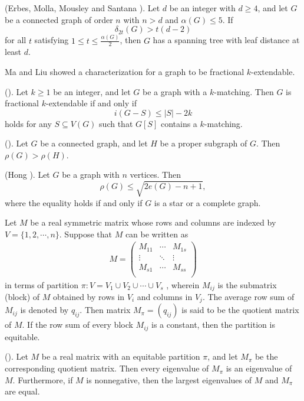 \documentclass[10pt]{article}
\numberwithin{equation}{section}
\begin{document}
\medskip

 (Erbes, Molla, Mousley and Santana \cite{EMMS}). Let $d$ be an integer with $d\geq4$, and let $G$ be a connected graph
of order $n$ with $n>d$ and $\alpha(G)\leq5$. If
$$
\delta_{2t}(G)>t(d-2)
$$
for all $t$ satisfying $1\leq t\leq\frac{\alpha(G)}{2}$, then $G$ has a spanning tree with leaf distance at least $d$.

\medskip

Ma and Liu \cite{ML} showed a characterization for a graph to be fractional $k$-extendable.

\medskip

 (\cite{ML}). Let $k\geq1$ be an integer, and let $G$ be a graph with a $k$-matching. Then $G$ is fractional
$k$-extendable if and only if
$$
i(G-S)\leq|S|-2k
$$
holds for any $S\subseteq V(G)$ such that $G[S]$ contains a $k$-matching.

\medskip

 (\cite{B}). Let $G$ be a connected graph, and let $H$ be a proper subgraph of $G$. Then $\rho(G)>\rho(H)$.

\medskip

 (Hong \cite{Ha}). Let $G$ be a graph with $n$ vertices. Then
$$
\rho(G)\leq\sqrt{2e(G)-n+1},
$$
where the equality holds if and only if $G$ is a star or a complete graph.

\medskip

Let $M$ be a real symmetric matrix whose rows and columns are indexed by $V=\{1,2,\cdots,n\}$.
Suppose that $M$ can be written as
\begin{align*}
M=\left(
  \begin{array}{ccc}
    M_{11} & \cdots & M_{1s}\\
    \vdots & \ddots & \vdots\\
    M_{s1} & \cdots & M_{ss}\\
  \end{array}
\right)
\end{align*}
in terms of partition $\pi: V=V_1\cup V_2\cup\cdots\cup V_s$ , wherein $M_{ij}$ is the submatrix (block) of $M$ obtained by rows in $V_i$ and
columns in $V_j$. The average row sum of $M_{ij}$ is denoted by $q_{ij}$. Then matrix $M_{\pi}=(q_{ij})$ is said to be the quotient matrix of $M$.
If the row sum of every block $M_{ij}$ is a constant, then the partition is equitable.

\medskip

 (\cite{YYSX}). Let $M$ be a real matrix with an equitable partition $\pi$, and let $M_{\pi}$ be the corresponding
quotient matrix. Then every eigenvalue of $M_{\pi}$ is an eigenvalue of $M$. Furthermore, if $M$ is nonnegative, then the largest eigenvalues of
$M$ and $M_{\pi}$ are equal.
\end{document}
